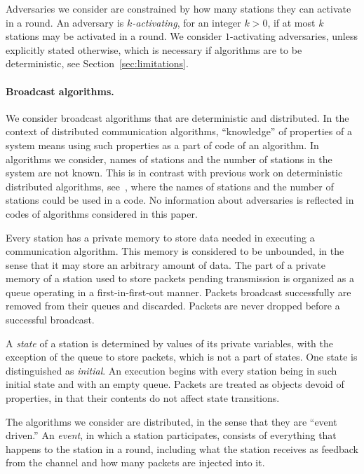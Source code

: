 \documentclass[11pt]{article}
\newcommand{\BBB}{\vspace*{-\bigskipamount}}
\newcommand{\Paragraph}[1]{\BBB\paragraph{#1}}
\begin{document}
Adversaries we consider are constrained by how many stations they can activate in a round.
An adversary is \emph{$k$-activating}, for an integer $k>0$, if at most $k$ stations may be activated in a round.
We consider $1$-activating adversaries, unless explicitly stated otherwise, which is necessary if algorithms are to be deterministic, see Section~\ref{sec:limitations}.




\Paragraph{Broadcast algorithms.}




We consider  broadcast algorithms that are deterministic and distributed.
In the context of distributed communication algorithms,  ``knowledge'' of properties of a system means using such properties as a part of code of an algorithm.
In algorithms we consider, names of stations and the number of stations in the system are not known.
This is in contrast with previous work on deterministic distributed algorithms, see~\cite{AnantharamuCKR-INFOCOM10, AnantharamuCKR-SIROCCO11, AnantharamuCR-OPODIS09, ChlebusKR09, ChlebusKR-TALG12}, where the names of stations and the number of stations could be used in a code.
No information about adversaries is reflected in codes of algorithms considered in this paper.



Every station has a private memory to store data needed in executing a communication algorithm.
This memory is considered to be unbounded, in the sense that it may store an arbitrary amount of data.
The part of a private memory of a station used to store packets pending transmission is organized as a queue operating  in a first-in-first-out manner.
Packets broadcast successfully are removed from their queues and discarded.
Packets are never dropped before a successful broadcast.

A \emph{state} of a station is determined by  values of its private variables, with the exception of  the queue to store packets, which is not a part of states.
One state is distinguished as \emph{initial}.
An execution begins with every station being in such initial state and with an empty queue.  
Packets are treated as objects devoid of properties, in that their contents do not affect state transitions.

The algorithms we consider are distributed, in the sense that they are ``event driven.''
An \emph{event}, in which a station participates, consists of everything that happens to the station in a round, including what the station receives as feedback from the channel and how many packets are injected into it.
\end{document}
